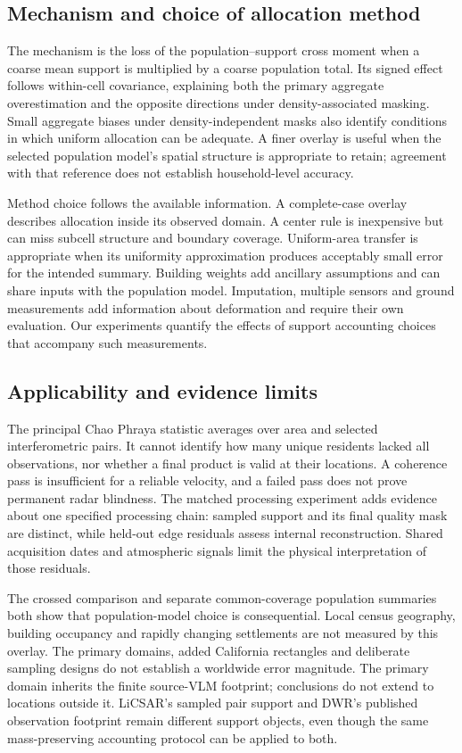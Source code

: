 \documentclass[pdflatex,sn-nature]{sn-jnl}
\begin{document}
\subsection{Mechanism and choice of allocation method}
The mechanism is the loss of the population--support cross moment when a coarse mean support is multiplied by a coarse population total. Its signed effect follows within-cell covariance, explaining both the primary aggregate overestimation and the opposite directions under density-associated masking. Small aggregate biases under density-independent masks also identify conditions in which uniform allocation can be adequate. A finer overlay is useful when the selected population model's spatial structure is appropriate to retain; agreement with that reference does not establish household-level accuracy.

Method choice follows the available information. A complete-case overlay describes allocation inside its observed domain. A center rule is inexpensive but can miss subcell structure and boundary coverage. Uniform-area transfer is appropriate when its uniformity approximation produces acceptably small error for the intended summary. Building weights add ancillary assumptions and can share inputs with the population model. Imputation, multiple sensors and ground measurements add information about deformation and require their own evaluation. Our experiments quantify the effects of support accounting choices that accompany such measurements.

\subsection{Applicability and evidence limits}
The principal Chao Phraya statistic averages over area and selected interferometric pairs. It cannot identify how many unique residents lacked all observations, nor whether a final product is valid at their locations. A coherence pass is insufficient for a reliable velocity, and a failed pass does not prove permanent radar blindness. The matched processing experiment adds evidence about one specified processing chain: sampled support and its final quality mask are distinct, while held-out edge residuals assess internal reconstruction. Shared acquisition dates and atmospheric signals limit the physical interpretation of those residuals.

The crossed comparison and separate common-coverage population summaries both show that population-model choice is consequential. Local census geography, building occupancy and rapidly changing settlements are not measured by this overlay. The primary domains, added California rectangles and deliberate sampling designs do not establish a worldwide error magnitude. The primary domain inherits the finite source-VLM footprint; conclusions do not extend to locations outside it. LiCSAR's sampled pair support and DWR's published observation footprint remain different support objects, even though the same mass-preserving accounting protocol can be applied to both.
\end{document}
